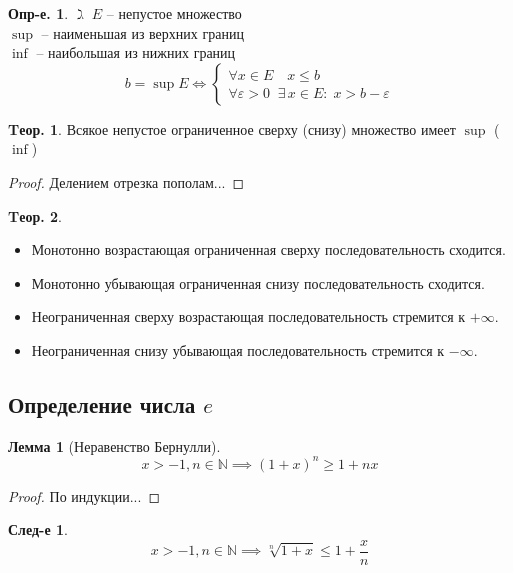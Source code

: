 \documentclass[a4paper,12pt]{article}
\numberwithin{figure}{section}
\theoremstyle{definition}
\newtheorem{definition}{Опр-е.}[section]
\theoremstyle{definition}
\newtheorem{theorem}{Tеор.}[section]
\newtheorem*{corollary}{След-е} %
\newtheorem{lemma}{Лемма}[section]
\def\.{\;\;}
\def\eps{\varepsilon}
\def\mathN{\mathbb{N}}
\def\leqs{\leqslant}
\def\geqs{\geqslant}
\def\lets {$\gimel\;$}
\begin{document}
\begin{definition}
	\lets $E$ -- непустое множество \\
	$\sup$ -- наименьшая из верхних границ \\
	$\inf$ -- наибольшая из нижних границ
	\[ b = \sup E \Longleftrightarrow
		\begin{cases*}
			\forall x \in E \quad x \leqs b \\
			\forall \eps > 0 \. \exists\, x \in E : \;  x > b - \eps
		\end{cases*}
	\]
\end{definition}

\begin{theorem}
	Всякое непустое ограниченное сверху (снизу) множество имеет $\sup$ ($\inf$)
\end{theorem}
\begin{proof} Делением отрезка пополам... \end{proof}

\begin{theorem}  \ \\
	\begin{itemize}
		\item Монотонно возрастающая ограниченная сверху последовательность сходится.
		\item Монотонно убывающая ограниченная снизу последовательность сходится.
		\item Неограниченная сверху возрастающая последовательность стремится к $+\infty$.
		\item Неограниченная снизу убывающая последовательность стремится к $-\infty$.
	\end{itemize}
\end{theorem}


\subsection{Определение числа $e$}

\begin{lemma}[Неравенство Бернулли]
	\[ x>-1, n \in \mathN \implies (1+x)^n \geqs 1+nx \]
\end{lemma}
\begin{proof} По индукции... \end{proof}

\begin{corollary}
	\[ x>-1, n \in \mathN \implies \sqrt[n]{1+x} \leqs 1+\frac{x}{n} \]
\end{corollary}
\end{document}
